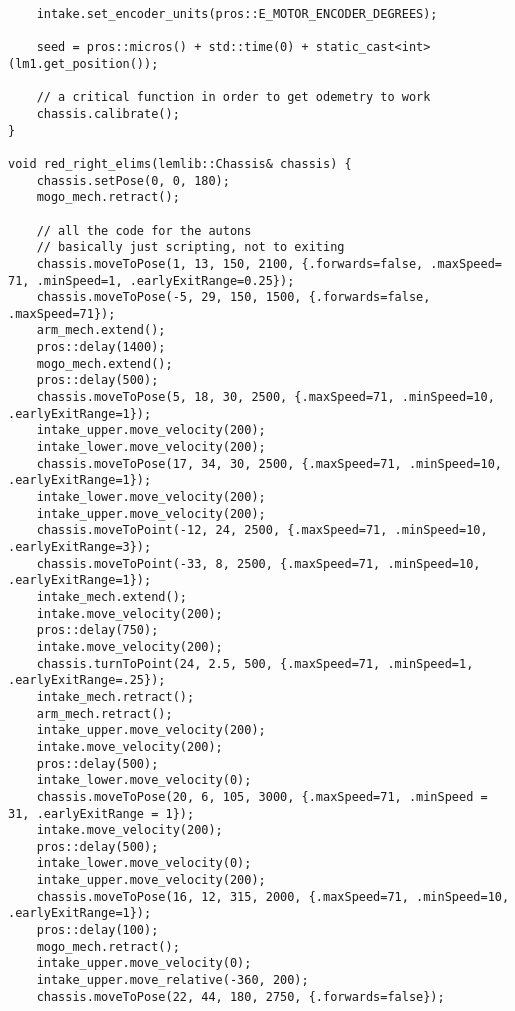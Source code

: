 \begin{verbatim}
    intake.set_encoder_units(pros::E_MOTOR_ENCODER_DEGREES);

    seed = pros::micros() + std::time(0) + static_cast<int>(lm1.get_position());

    // a critical function in order to get odemetry to work
    chassis.calibrate();
}

void red_right_elims(lemlib::Chassis& chassis) {
    chassis.setPose(0, 0, 180);
    mogo_mech.retract();

    // all the code for the autons
    // basically just scripting, not to exiting
    chassis.moveToPose(1, 13, 150, 2100, {.forwards=false, .maxSpeed= 71, .minSpeed=1, .earlyExitRange=0.25});
    chassis.moveToPose(-5, 29, 150, 1500, {.forwards=false, .maxSpeed=71});
    arm_mech.extend();
    pros::delay(1400);
    mogo_mech.extend();
    pros::delay(500);
    chassis.moveToPose(5, 18, 30, 2500, {.maxSpeed=71, .minSpeed=10, .earlyExitRange=1});
    intake_upper.move_velocity(200);
    intake_lower.move_velocity(200);
    chassis.moveToPose(17, 34, 30, 2500, {.maxSpeed=71, .minSpeed=10, .earlyExitRange=1});
    intake_lower.move_velocity(200);
    intake_upper.move_velocity(200);
    chassis.moveToPoint(-12, 24, 2500, {.maxSpeed=71, .minSpeed=10, .earlyExitRange=3});
    chassis.moveToPoint(-33, 8, 2500, {.maxSpeed=71, .minSpeed=10, .earlyExitRange=1});
    intake_mech.extend();
    intake.move_velocity(200);
    pros::delay(750);
    intake.move_velocity(200);
    chassis.turnToPoint(24, 2.5, 500, {.maxSpeed=71, .minSpeed=1, .earlyExitRange=.25});
    intake_mech.retract();
    arm_mech.retract();
    intake_upper.move_velocity(200);
    intake.move_velocity(200);
    pros::delay(500);
    intake_lower.move_velocity(0);
    chassis.moveToPose(20, 6, 105, 3000, {.maxSpeed=71, .minSpeed = 31, .earlyExitRange = 1});
    intake.move_velocity(200);
    pros::delay(500);
    intake_lower.move_velocity(0);
    intake_upper.move_velocity(200);
    chassis.moveToPose(16, 12, 315, 2000, {.maxSpeed=71, .minSpeed=10, .earlyExitRange=1});
    pros::delay(100);
    mogo_mech.retract();
    intake_upper.move_velocity(0);
    intake_upper.move_relative(-360, 200);
    chassis.moveToPose(22, 44, 180, 2750, {.forwards=false});
    


\end{verbatim}
